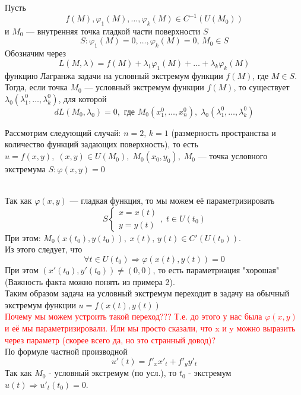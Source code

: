 \begin{Th}
    Пусть 
    \[
        f(M), \varphi_1(M), \dots, \varphi_k(M) \in C^{-1}(U(M_0))
    \] 
    и $M_0$ --- внутренняя точка гладкой части поверхности $S$ 
    \[
    S: \varphi_1(M) = 0, \dots, \varphi_k(M) = 0, \, M_0 \in S
    \]
    Обозначим через 
    \[
        L(M, \lambda) = f(M) + \lambda_1\varphi_1(M) + \dots + \lambda_k\varphi_k(M)
    \]
    функцию Лагранжа задачи на условный экстремум функции $f(M)$, где $M \in S$. Тогда, если точка $M_0$ --- условный экстремум функции $f(M)$, то существует $\lambda_0(\lambda^0_1, \dots, \lambda^0_k)$, для которой
    \[
        dL(M_0, \lambda_0) = 0, \text{ где }  M_0(x^0_1, \dots, x^0_n), \; \lambda_0(\lambda^0_1, \dots, \lambda^0_k)
    \]
\end{Th}
\begin{Proof}
    Рассмотрим следующий случай: $n = 2, \, k = 1$ (размерность пространства и количество функций задающих поверхность), то есть $u = f(x, y), \; (x, y) \in U(M_0), \; M_0(x_0, y_0), \; M_0$ --- точка условного экстремума $S : \varphi(x, y) = 0$\\
    \begin{figure}[h!]
        \noindent{}
    \end{figure}\\
    Так как $\varphi(x, y)$ --- гладкая функция, то мы можем её параметризировать
    \[
        S \begin{cases} 
            x = x(t)\\
            y = y(t)
          \end{cases}, \; t \in U(t_0)
    \]
    При этом: $M_0(x(t_0), y(t_0)), \; x(t), \, y(t) \in C'(U(t_0))$.\\
    Из этого следует, что
    \[
        \forall t \in U(t_0) \Rightarrow \varphi(x(t), y(t)) = 0
    \]
    При этом $(x'(t_0), y'(t_0)) \neq (0, 0)$, то есть параметриация "хорошая" (Важность факта можно понять из примера 2).\\
    Таким образом задача на условный экстремум переходит в задачу на обычный экстремум функции $u = f(x(t), y(t))$\\
    \textcolor{red}{Почему мы можем устроить такой переход??? Т.е. до этого у нас была $\varphi(x, y)$ и её мы параметризировали. Или мы просто сказали, что x и y можно выразить через параметр (скорее всего да, но это странный довод)?}\\
    По формуле частной производной
    \[
        u'(t) = f'_xx'_t+f'_yy'_t
    \]
    Так как $M_0$ - условный экстремум (по усл.), то $t_0$ - экстремум $u(t) \Rightarrow u'_t(t_0) = 0$.
    

\end{Proof}
